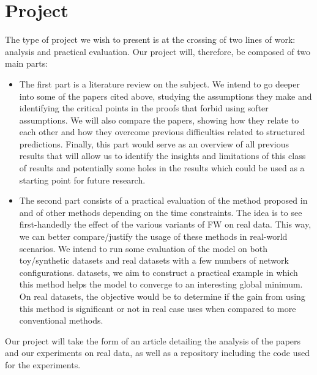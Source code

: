 \documentclass{article}
\begin{document}
\section*{Project}
The type of project we wish to present is at the crossing of two lines of work:
analysis and practical evaluation. Our project will, therefore, be composed of
two main parts:
\begin{itemize}
    \item The first part is a literature review on the subject. We intend to go
deeper into some of the papers cited above, studying the assumptions they make
and identifying the critical points in the proofs that forbid using softer
assumptions. We will also compare the papers, showing how they relate to each
other and how they overcome previous difficulties related to structured
predictions. Finally, this part would serve as an overview of all previous
results that will allow us to identify the insights and limitations of this
class of results and potentially some holes in the results which could be used
as a starting point for future research.
    \item The second part consists of a practical evaluation of the method
proposed in and of other methods depending on the time constraints. The idea is
to see first-handedly the effect of the various variants of FW on real data.
This way, we can better compare/justify the usage of these methods in real-world
scenarios. We intend to run some evaluation of the model on both toy/synthetic
datasets and real datasets with a few numbers of network configurations. %
datasets, we aim to construct a practical example in which this method helps the
model to converge to an interesting global minimum. On real datasets, the
objective would be to determine if the gain from using this method is
significant or not in real case uses when compared to more conventional methods.
\end{itemize}


Our project will take the form of an article detailing the analysis of the
papers and our experiments on real data, as well as a repository including the
code used for the experiments.

\nocite{*}
\printbibliography
\end{document}
